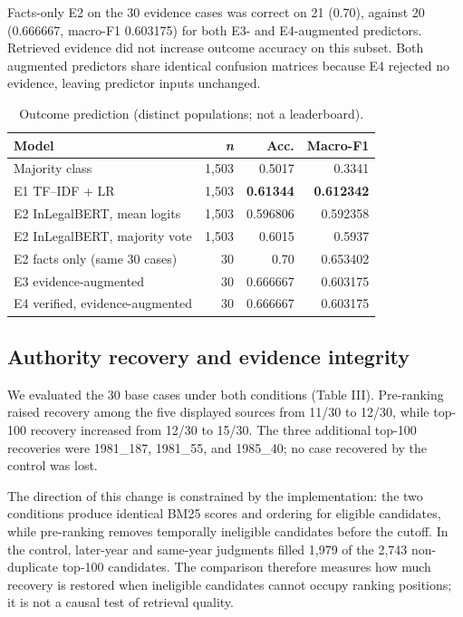 \documentclass[conference]{IEEEtran}
\begin{document}
Facts-only E2 on the 30 evidence cases was correct on 21 (0.70), against 20 (0.666667, macro-F1 0.603175) for both E3- and E4-augmented predictors. Retrieved evidence did not increase outcome accuracy on this subset. Both augmented predictors share identical confusion matrices because E4 rejected no evidence, leaving predictor inputs unchanged.

\begin{table}[!t]
\caption{Outcome prediction (distinct populations; not a leaderboard).}
\label{tab:2}
\centering\footnotesize

\setlength{\tabcolsep}{4pt}
\begin{tabular}{|l|r|r|r|}
\hline
\textbf{Model} & \textit{n} & \textbf{Acc.} & \textbf{Macro-F1} \\ \hline
Majority class & 1,503 & 0.5017 & 0.3341 \\
E1 TF--IDF + LR & 1,503 & \textbf{0.61344} & \textbf{0.612342} \\
E2 InLegalBERT, mean logits & 1,503 & 0.596806 & 0.592358 \\
E2 InLegalBERT, majority vote & 1,503 & 0.6015 & 0.5937 \\
E2 facts only (same 30 cases) & 30 & 0.70 & 0.653402 \\
E3 evidence-augmented & 30 & 0.666667 & 0.603175 \\
E4 verified, evidence-augmented & 30 & 0.666667 & 0.603175 \\ \hline
\end{tabular}
\end{table}

\subsection{Authority recovery and evidence integrity}
We evaluated the 30 base cases under both conditions (Table III). Pre-ranking raised recovery among the five displayed sources from 11/30 to 12/30, while top-100 recovery increased from 12/30 to 15/30. The three additional top-100 recoveries were 1981\_187, 1981\_55, and 1985\_40; no case recovered by the control was lost.

The direction of this change is constrained by the implementation: the two conditions produce identical BM25 scores and ordering for eligible candidates, while pre-ranking removes temporally ineligible candidates before the cutoff. In the control, later-year and same-year judgments filled 1,979 of the 2,743 non-duplicate top-100 candidates. The comparison therefore measures how much recovery is restored when ineligible candidates cannot occupy ranking positions; it is not a causal test of retrieval quality.
\end{document}
